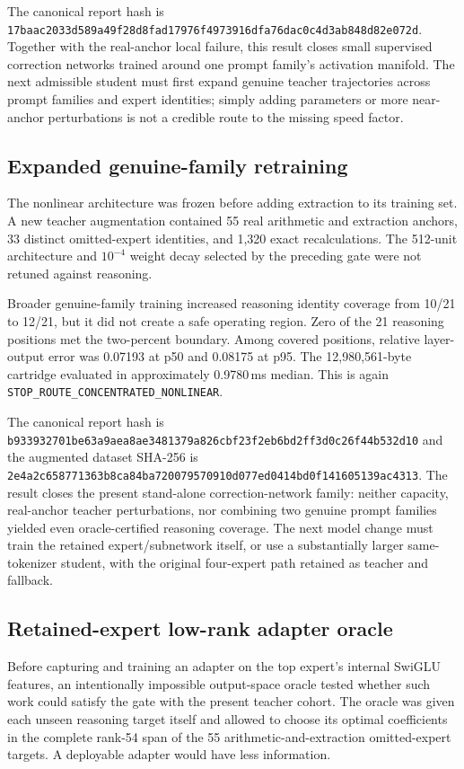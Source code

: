 The canonical report hash is
\texttt{17baac2033d589a49f28d8fad17976f4973916dfa76dac0c4d3ab848d82e072d}.
Together with the real-anchor local failure, this result closes small supervised
correction networks trained around one prompt family's activation manifold.
The next admissible student must first expand genuine teacher trajectories
across prompt families and expert identities; simply adding parameters or more
near-anchor perturbations is not a credible route to the missing speed factor.

\subsection{Expanded genuine-family retraining}

The nonlinear architecture was frozen before adding extraction to its training
set.  A new teacher augmentation contained 55 real arithmetic and extraction
anchors, 33 distinct omitted-expert identities, and 1,320 exact recalculations.
The 512-unit architecture and $10^{-4}$ weight decay selected by the preceding
gate were not retuned against reasoning.

Broader genuine-family training increased reasoning identity coverage from
10/21 to 12/21, but it did not create a safe operating region.  Zero of the 21
reasoning positions met the two-percent boundary.  Among covered positions,
relative layer-output error was 0.07193 at p50 and 0.08175 at p95.  The
12,980,561-byte cartridge evaluated in approximately 0.9780\,ms median.  This
is again \texttt{STOP\_ROUTE\_CONCENTRATED\_NONLINEAR}.

The canonical report hash is
\texttt{b933932701be63a9aea8ae3481379a826cbf23f2eb6bd2ff3d0c26f44b532d10}
and the augmented dataset SHA-256 is
\texttt{2e4a2c658771363b8ca84ba720079570910d077ed0414bd0f141605139ac4313}.
The result closes the present stand-alone correction-network family: neither
capacity, real-anchor teacher perturbations, nor combining two genuine prompt
families yielded even oracle-certified reasoning coverage.  The next model
change must train the retained expert/subnetwork itself, or use a substantially
larger same-tokenizer student, with the original four-expert path retained as
teacher and fallback.

\subsection{Retained-expert low-rank adapter oracle}

Before capturing and training an adapter on the top expert's internal SwiGLU
features, an intentionally impossible output-space oracle tested whether such
work could satisfy the gate with the present teacher cohort.  The oracle was
given each unseen reasoning target itself and allowed to choose its optimal
coefficients in the complete rank-54 span of the 55 arithmetic-and-extraction
omitted-expert targets.  A deployable adapter would have less information.

